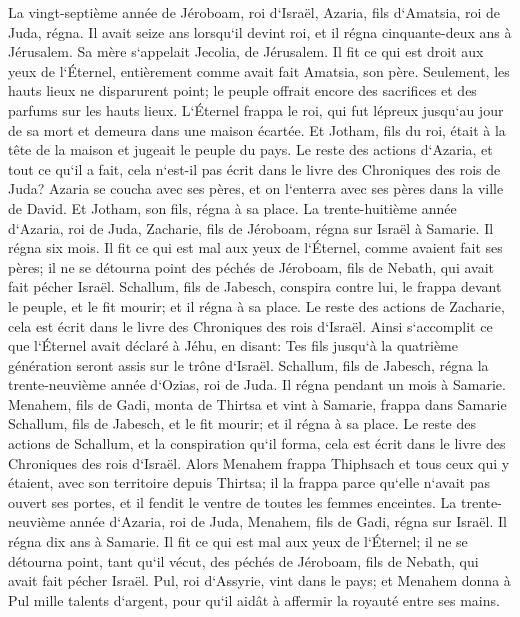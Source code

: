 \verse La vingt-septième année de Jéroboam, roi d`Israël, Azaria, fils d`Amatsia, roi de Juda, régna. 
\verse Il avait seize ans lorsqu`il devint roi, et il régna cinquante-deux ans à Jérusalem. Sa mère s`appelait Jecolia, de Jérusalem. 
\verse Il fit ce qui est droit aux yeux de l`Éternel, entièrement comme avait fait Amatsia, son père. 
\verse Seulement, les hauts lieux ne disparurent point; le peuple offrait encore des sacrifices et des parfums sur les hauts lieux. 
\verse L`Éternel frappa le roi, qui fut lépreux jusqu`au jour de sa mort et demeura dans une maison écartée. Et Jotham, fils du roi, était à la tête de la maison et jugeait le peuple du pays. 
\verse Le reste des actions d`Azaria, et tout ce qu`il a fait, cela n`est-il pas écrit dans le livre des Chroniques des rois de Juda? 
\verse Azaria se coucha avec ses pères, et on l`enterra avec ses pères dans la ville de David. Et Jotham, son fils, régna à sa place. 
\verse La trente-huitième année d`Azaria, roi de Juda, Zacharie, fils de Jéroboam, régna sur Israël à Samarie. Il régna six mois. 
\verse Il fit ce qui est mal aux yeux de l`Éternel, comme avaient fait ses pères; il ne se détourna point des péchés de Jéroboam, fils de Nebath, qui avait fait pécher Israël. 
\verse Schallum, fils de Jabesch, conspira contre lui, le frappa devant le peuple, et le fit mourir; et il régna à sa place. 
\verse Le reste des actions de Zacharie, cela est écrit dans le livre des Chroniques des rois d`Israël. 
\verse Ainsi s`accomplit ce que l`Éternel avait déclaré à Jéhu, en disant: Tes fils jusqu`à la quatrième génération seront assis sur le trône d`Israël. 
\verse Schallum, fils de Jabesch, régna la trente-neuvième année d`Ozias, roi de Juda. Il régna pendant un mois à Samarie. 
\verse Menahem, fils de Gadi, monta de Thirtsa et vint à Samarie, frappa dans Samarie Schallum, fils de Jabesch, et le fit mourir; et il régna à sa place. 
\verse Le reste des actions de Schallum, et la conspiration qu`il forma, cela est écrit dans le livre des Chroniques des rois d`Israël. 
\verse Alors Menahem frappa Thiphsach et tous ceux qui y étaient, avec son territoire depuis Thirtsa; il la frappa parce qu`elle n`avait pas ouvert ses portes, et il fendit le ventre de toutes les femmes enceintes. 
\verse La trente-neuvième année d`Azaria, roi de Juda, Menahem, fils de Gadi, régna sur Israël. Il régna dix ans à Samarie. 
\verse Il fit ce qui est mal aux yeux de l`Éternel; il ne se détourna point, tant qu`il vécut, des péchés de Jéroboam, fils de Nebath, qui avait fait pécher Israël. 
\verse Pul, roi d`Assyrie, vint dans le pays; et Menahem donna à Pul mille talents d`argent, pour qu`il aidât à affermir la royauté entre ses mains. 
